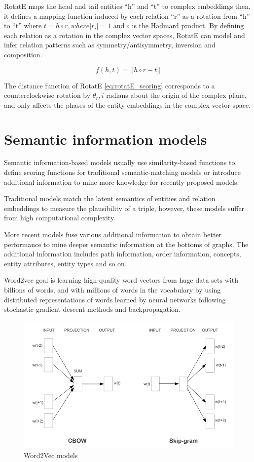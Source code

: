 RotatE maps the head and tail entities ``h'' and ``t'' to complex embeddings then, it defines a mapping function induced by each relation ``r'' as a rotation from ``h'' to ``t'' where $t = h \circ r, where |r_i| = 1$ and $\circ$ is the Hadmard product.
By defining each relation as a rotation in the complex vector spaces, RotatE can model and infer relation patterns such as symmetry/antisymmetry, inversion and composition. 

\begin{equation}
    \label{eq:rotatE_scoring}
    f(h, t) = ||h \circ r - t||
\end{equation}

The distance function of RotatE \ref{eq:rotatE_scoring} corresponds to a counterclockwise rotation by $\theta_r,i$ radians about the origin of the complex plane, and only affects the phases of the entity embeddings in the complex vector space.

\section{Semantic information models}\label{sec:emb-semantic}
Semantic information-based models usually use similarity-based functions to define scoring functions for traditional semantic-matching models or introduce additional information to mine more knowledge for recently proposed models.

Traditional models match the latent semantics of entities and relation embeddings to measure the plausibility of a triple, however, these models suffer from high computational complexity.

More recent models fuse various additional information to obtain better performance to mine deeper semantic information at the bottoms of graphs. The additional information includes path information, order information, concepts, entity attributes, entity types and so on.

Word2vec\cite{} goal is learning high-quality word vectors from huge data sets with billions of words, and with millions of words in the vocabulary by using distributed representations of words learned by neural networks following stochastic gradient descent methods and backpropagation.

\begin{figure}[!htp]
    \centering
    \includegraphics[width=.75\textwidth]{fig/embeddings/Word2Vec.png}
    \caption{Word2Vec models}
    \label{fig:word2Vec}
\end{figure}


